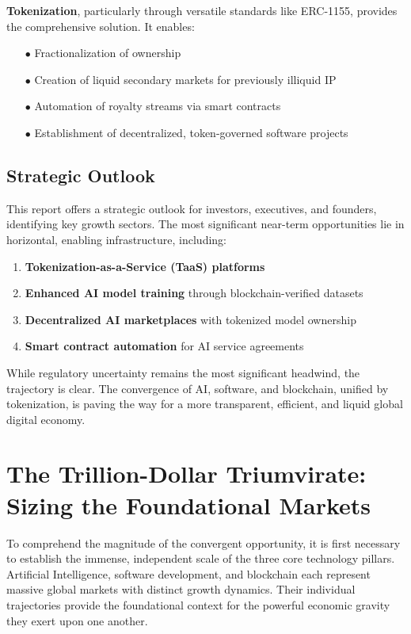 \documentclass[11pt,a4paper]{report}
\newcommand{\techterm}[1]{\textbf{\textcolor{ocean}{#1}}}
\begin{document}
\techterm{Tokenization}, particularly through versatile standards like ERC-1155, provides the comprehensive solution. It enables:

\begin{itemize}[leftmargin=2cm]
    \item[$\bullet$] Fractionalization of ownership
    \item[$\bullet$] Creation of liquid secondary markets for previously illiquid IP
    \item[$\bullet$] Automation of royalty streams via smart contracts
    \item[$\bullet$] Establishment of decentralized, token-governed software projects
\end{itemize}

\section*{Strategic Outlook}

This report offers a strategic outlook for investors, executives, and founders, identifying key growth sectors. The most significant near-term opportunities lie in horizontal, enabling infrastructure, including:

\begin{enumerate}
    \item \textbf{Tokenization-as-a-Service (TaaS) platforms}
    \item \textbf{Enhanced AI model training} through blockchain-verified datasets
    \item \textbf{Decentralized AI marketplaces} with tokenized model ownership
    \item \textbf{Smart contract automation} for AI service agreements
\end{enumerate}

While regulatory uncertainty remains the most significant headwind, the trajectory is clear. The convergence of AI, software, and blockchain, unified by tokenization, is paving the way for a more transparent, efficient, and liquid global digital economy.
\chapter{The Trillion-Dollar Triumvirate: Sizing the Foundational Markets}

To comprehend the magnitude of the convergent opportunity, it is first necessary to establish the immense, independent scale of the three core technology pillars. Artificial Intelligence, software development, and blockchain each represent massive global markets with distinct growth dynamics. Their individual trajectories provide the foundational context for the powerful economic gravity they exert upon one another.
\end{document}
